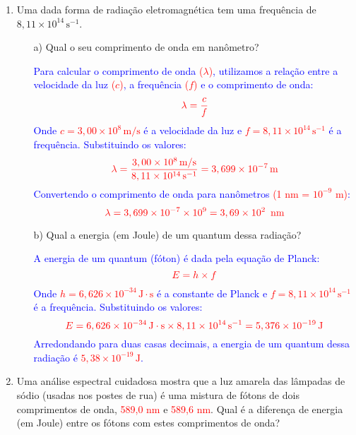 \documentclass[a4paper, 12pt]{article}
\begin{document}
\begin{enumerate}
	\item Uma dada forma de radiação eletromagnética tem uma frequência de \(8,11 \times 10^{14} \, \text{s}^{-1}\).
	      \begin{enumerate}
		      \item[a)] Qual o seu comprimento de onda em nanômetro?
		            
		            \textcolor{blue}{
			            Para calcular o comprimento de onda \textcolor{red}{(\(\lambda\))}, utilizamos a relação entre a velocidade da luz \textcolor{red}{(\(c\))}, a frequência \textcolor{red}{(\(f\))} e o comprimento de onda:
			            \[
				            \textcolor{red}{\lambda = \frac{c}{f}}
			            \]
			            Onde \textcolor{red}{\(c = 3,00 \times 10^8 \, \text{m/s}\)} é a velocidade da luz e \textcolor{red}{\(f = 8,11 \times 10^{14} \, \text{s}^{-1}\)} é a frequência. Substituindo os valores:
			            \[
				            \textcolor{red}{\lambda = \frac{3,00 \times 10^8 \, \text{m/s}}{8,11 \times 10^{14} \, \text{s}^{-1}} = 3,699 \times 10^{-7} \, \text{m}}
			            \]
			            Convertendo o comprimento de onda para nanômetros \textcolor{red}{(1 nm = \(10^{-9}\) m)}:
			            \[
				            \textcolor{red}{\lambda = 3,699 \times 10^{-7} \times 10^9 = 3,69 \times 10^2 \, \text{ nm}}
			            \]
		            }
		      \item[b)] Qual a energia (em Joule) de um quantum dessa radiação?
		            
		            \textcolor{blue}{
			            A energia de um quantum (fóton) é dada pela equação de Planck:
			            \[
				            \textcolor{red}{E = h \times f}
			            \]
			            Onde \textcolor{red}{\(h = 6,626 \times 10^{-34} \, \text{J} \cdot \text{s}\)} é a constante de Planck e \textcolor{red}{\(f = 8,11 \times 10^{14} \, \text{s}^{-1}\)} é a frequência. Substituindo os valores:
			            \[
				            \textcolor{red}{E = 6,626 \times 10^{-34} \, \text{J} \cdot \text{s} \times 8,11 \times 10^{14} \, \text{s}^{-1} = 5,376 \times 10^{-19} \, \text{J}}
			            \]
			            Arredondando para duas casas decimais, a energia de um quantum dessa radiação é \textcolor{red}{\(5,38 \times 10^{-19} \, \text{J}\)}.
		            }
	      \end{enumerate}
	      
	\item Uma análise espectral cuidadosa mostra que a luz amarela das lâmpadas de sódio (usadas nos postes de rua) é uma mistura de fótons de dois comprimentos de onda, \textcolor{red}{589,0 nm} e \textcolor{red}{589,6 nm}. Qual é a diferença de energia (em Joule) entre os fótons com estes comprimentos de onda?
	      

\end{enumerate}
\end{document}
